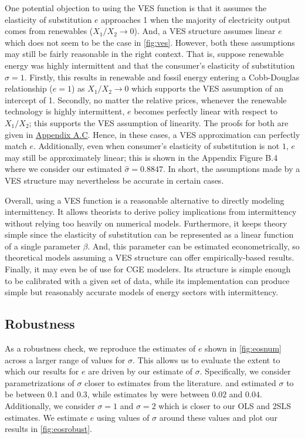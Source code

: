 \documentclass[11pt,a4paper,leqno]{extarticle}
\begin{document}
	
	One potential objection to using the VES function is that it assumes the elasticity of substitution $e$ approaches 1 when the majority of electricity output comes from renewables ($X_1/X_2 \to 0$). And, a VES structure assumes linear $e$ which does not seem to be the case in \autoref{fig:ves}. However, both these assumptions may still be fairly reasonable in the right context. That is, suppose renewable energy was highly intermittent and that the consumer's elasticity of substitution $\sigma = 1$. Firstly, this results in renewable  and fossil energy entering a Cobb-Douglas relationship ($e = 1$) as $X_1/X_2 \to 0$ which supports the VES assumption of an intercept of 1. Secondly, no matter the relative prices, whenever the renewable technology is highly intermittent, $e$ becomes perfectly linear with respect to $X_1/X_2$; this supports the VES assumption of linearity. The proofs for both are given in \hyperref[sec:asympeos]{Appendix A.C}. Hence, in these cases, a VES approximation  can perfectly match $e$. Additionally, even when consumer's elasticity of substitution is not $1$, $e$ may still be approximately linear; this is shown in the Appendix Figure B.4 where we consider our estimated $\hat{\sigma} = 0.8847$. In short, the assumptions made by a VES structure may nevertheless be accurate in certain cases. 
	
	
	
	Overall, using a VES function is a reasonable alternative to directly modeling intermittency. It allows theorists to derive policy implications from intermittency without relying too heavily on numerical models. Furthermore, it keeps theory simple since the elasticity of substitution can be represented as a linear function of a single parameter $\beta$. And, this parameter can be estimated econometrically, so theoretical models assuming a VES structure can offer empirically-based results. Finally, it may even be of use for CGE modelers. Its structure is simple enough to be calibrated with a given set of data, while its implementation can produce simple but reasonably accurate models of energy sectors with intermittency. 
	
	\subsection{Robustness}
	\label{sec:robust}
	
	As a robustness check, we reproduce the estimates of $e$ shown in \autoref{fig:eosnum} across a larger range of values for $\sigma$. This allows us to  evaluate the extent to which our results for $e$ are driven by our estimate of $\sigma$. Specifically, we consider parametrizations of $\sigma$ closer to estimates from the literature. \citet{Herriges} and \citet{KS1994} estimated $\sigma$ to be between 0.1 and 0.3, while estimates by \citet{Schwarz} were between $0.02$ and $0.04$. Additionally, we consider $\sigma = 1$ and $\sigma = 2$ which is closer to our OLS and 2SLS estimates.  We estimate $e$ using values of $\sigma$ around these values and plot our results in  \autoref{fig:eosrobust}. 
	
\end{document}
